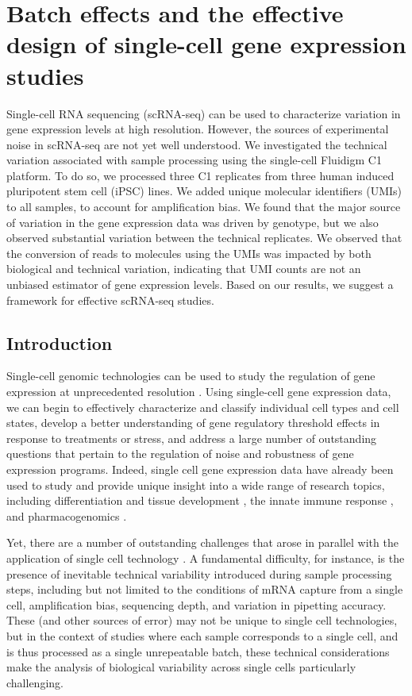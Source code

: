 \chapter{Batch effects and the effective design of single-cell gene expression studies}\label{ch:singleCellSeq}

Single-cell RNA sequencing (scRNA-seq) can be used to characterize
variation in gene expression levels at high resolution. However, the
sources of experimental noise in scRNA-seq are not yet well understood.
We investigated the technical variation associated with sample
processing using the single-cell Fluidigm C1 platform. To do so, we
processed three C1 replicates from three human induced pluripotent stem
cell (iPSC) lines. We added unique molecular identifiers (UMIs) to all
samples, to account for amplification bias. We found that the major
source of variation in the gene expression data was driven by genotype,
but we also observed substantial variation between the technical
replicates. We observed that the conversion of reads to molecules using
the UMIs was impacted by both biological and technical variation,
indicating that UMI counts are not an unbiased estimator of gene
expression levels. Based on our results, we suggest a framework for
effective scRNA-seq studies.

\section{Introduction}\label{ch04-introduction}

Single-cell genomic technologies can be used to study the regulation of
gene expression at unprecedented resolution \citep{Macaulay2014,
Saliba2014}. Using single-cell gene expression data, we can begin to
effectively characterize and classify individual cell types and cell
states, develop a better understanding of gene regulatory threshold
effects in response to treatments or stress, and address a large number
of outstanding questions that pertain to the regulation of noise and
robustness of gene expression programs. Indeed, single cell gene
expression data have already been used to study and provide unique
insight into a wide range of research topics, including differentiation
and tissue development \citep{Macosko2015, Handel2016, Drissen2016},
the innate immune response \citep{Shalek2013, Jaitin2014}, and
pharmacogenomics \citep{Miyamoto2015, Kim2015}.

Yet, there are a number of outstanding challenges that arose in parallel
with the application of single cell technology \citep{Stegle2015}. A
fundamental difficulty, for instance, is the presence of inevitable
technical variability introduced during sample processing steps,
including but not limited to the conditions of mRNA capture from a
single cell, amplification bias, sequencing depth, and variation in
pipetting accuracy. These (and other sources of error) may not be unique
to single cell technologies, but in the context of studies where each
sample corresponds to a single cell, and is thus processed as a single
unrepeatable batch, these technical considerations make the analysis of
biological variability across single cells particularly challenging.

